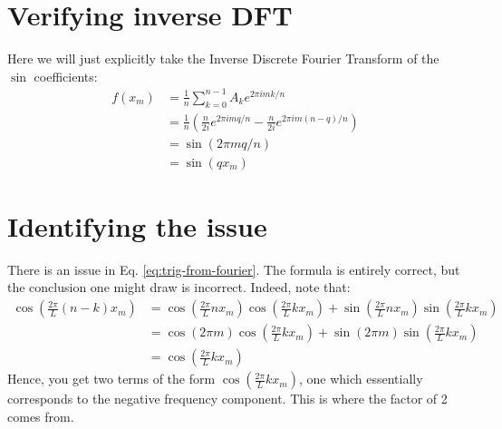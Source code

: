 \documentclass[reqno]{article}
\begin{document}
\section{Verifying inverse DFT}
Here we will just explicitly take the Inverse Discrete Fourier Transform of the $\sin$ coefficients:
\begin{equation}
    \begin{split}
        f(x_m)
        &=
        \frac{1}{n} \sum_{k = 0}^{n - 1}
        A_k e^{2\pi i m k / n} \\
        &=
        \frac{1}{n} \left(\frac{n}{2 i} e^{2\pi i m q / n}
        - \frac{n}{2 i} e^{2 \pi i m (n - q) / n} \right) \\
        &=
        \sin(2 \pi m q / n) \\
        &=
        \sin(q x_m)
    \end{split}
\end{equation}

\section{Identifying the issue}
There is an issue in Eq. \eqref{eq:trig-from-fourier}.
The formula is entirely correct, but the conclusion one might draw is incorrect.
Indeed, note that:
\begin{equation}
    \begin{split}
        \cos\left(\frac{2\pi}{L} (n - k) x_m \right)
        &=
        \cos\left(\frac{2\pi}{L} n x_m \right) \cos\left(\frac{2\pi}{L} k x_m \right)
        + \sin\left(\frac{2\pi}{L} n x_m \right) \sin\left(\frac{2\pi}{L} k x_m \right) \\
        &=
        \cos\left(2\pi m \right) \cos\left(\frac{2\pi}{L} k x_m \right)
        + \sin\left(2\pi m \right) \sin\left(\frac{2\pi}{L} k x_m \right) \\
        &= \cos\left(\frac{2\pi}{L} k x_m \right)
    \end{split}
\end{equation}
Hence, you get two terms of the form $\cos\left(\frac{2\pi}{L} k x_m \right)$, one which essentially corresponds to the negative frequency component. 
This is where the factor of 2 comes from.
\end{document}
